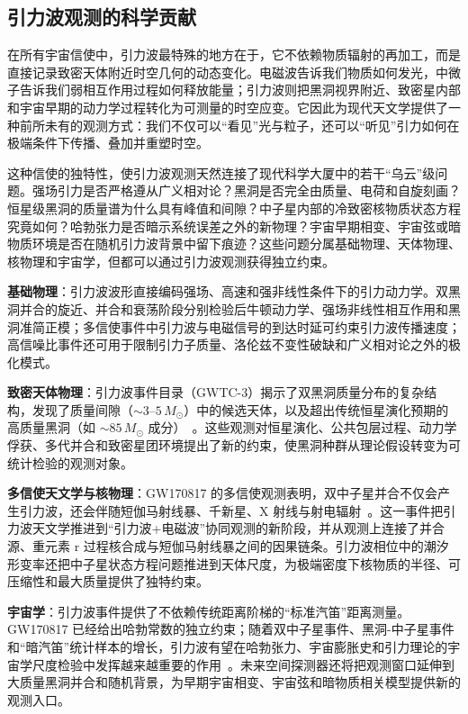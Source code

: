 \subsection{引力波观测的科学贡献}

在所有宇宙信使中，引力波最特殊的地方在于，它不依赖物质辐射的再加工，而是直接记录致密天体附近时空几何的动态变化。电磁波告诉我们物质如何发光，中微子告诉我们弱相互作用过程如何释放能量；引力波则把黑洞视界附近、致密星内部和宇宙早期的动力学过程转化为可测量的时空应变。它因此为现代天文学提供了一种前所未有的观测方式：我们不仅可以“看见”光与粒子，还可以“听见”引力如何在极端条件下传播、叠加并重塑时空。

这种信使的独特性，使引力波观测天然连接了现代科学大厦中的若干“乌云”级问题。强场引力是否严格遵从广义相对论？黑洞是否完全由质量、电荷和自旋刻画？恒星级黑洞的质量谱为什么具有峰值和间隙？中子星内部的冷致密核物质状态方程究竟如何？哈勃张力是否暗示系统误差之外的新物理？宇宙早期相变、宇宙弦或暗物质环境是否在随机引力波背景中留下痕迹？这些问题分属基础物理、天体物理、核物理和宇宙学，但都可以通过引力波观测获得独立约束。

\textbf{基础物理}：引力波波形直接编码强场、高速和强非线性条件下的引力动力学。双黑洞并合的旋近、并合和衰荡阶段分别检验后牛顿动力学、强场非线性相互作用和黑洞准简正模；多信使事件中引力波与电磁信号的到达时延可约束引力波传播速度；高信噪比事件还可用于限制引力子质量、洛伦兹不变性破缺和广义相对论之外的极化模式。

\textbf{致密天体物理}：引力波事件目录（GWTC-3）揭示了双黑洞质量分布的复杂结构，发现了质量间隙（$\sim 3$--$5\,M_\odot$）中的候选天体，以及超出传统恒星演化预期的高质量黑洞（如 $\sim 85\,M_\odot$ 成分）~\cite{Abbott2021GWTC3}。这些观测对恒星演化、公共包层过程、动力学俘获、多代并合和致密星团环境提出了新的约束，使黑洞种群从理论假设转变为可统计检验的观测对象。

\textbf{多信使天文学与核物理}：GW170817 的多信使观测表明，双中子星并合不仅会产生引力波，还会伴随短伽马射线暴、千新星、X 射线与射电辐射~\cite{Abbott2017GW170817}。这一事件把引力波天文学推进到“引力波+电磁波”协同观测的新阶段，并从观测上连接了并合源、重元素 r 过程核合成与短伽马射线暴之间的因果链条。引力波相位中的潮汐形变率还把中子星状态方程问题推进到天体尺度，为极端密度下核物质的半径、可压缩性和最大质量提供了独特约束。

\textbf{宇宙学}：引力波事件提供了不依赖传统距离阶梯的“标准汽笛”距离测量。GW170817 已经给出哈勃常数的独立约束；随着双中子星事件、黑洞-中子星事件和“暗汽笛”统计样本的增长，引力波有望在哈勃张力、宇宙膨胀史和引力理论的宇宙学尺度检验中发挥越来越重要的作用~\cite{Jin2025GWStandardSirens}。未来空间探测器还将把观测窗口延伸到大质量黑洞并合和随机背景，为早期宇宙相变、宇宙弦和暗物质相关模型提供新的观测入口。

